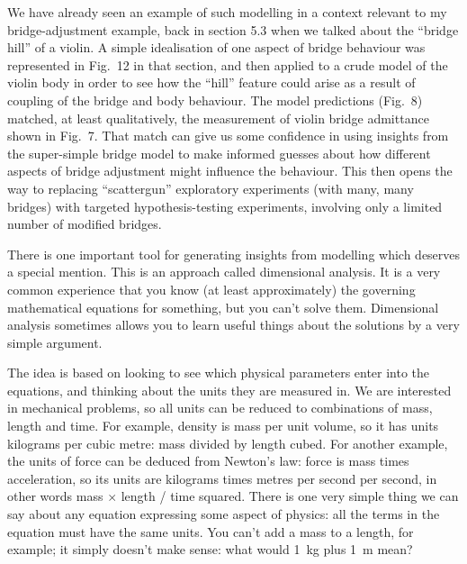   We have already seen an example of such modelling in a context relevant to my 
  bridge-adjustment example, back in section 5.3 when we talked about the 
  “bridge hill” of a violin. A simple idealisation of one aspect of bridge 
  behaviour was represented in Fig.\ 12 in that section, and then applied to a 
  crude model of the violin body in order to see how the “hill” feature could 
  arise as a result of coupling of the bridge and body behaviour. The model 
  predictions (Fig.\ 8) matched, at least qualitatively, the measurement of 
  violin bridge admittance shown in Fig.\ 7. That match can give us some 
  confidence in using insights from the super-simple bridge model to make 
  informed guesses about how different aspects of bridge adjustment might 
  influence the behaviour. This then opens the way to replacing “scattergun” 
  exploratory experiments (with many, many bridges) with targeted 
  hypothesis-testing experiments, involving only a limited number of modified 
  bridges. 

  There is one important tool for generating insights from modelling which 
  deserves a special mention. This is an approach called dimensional analysis. 
  It is a very common experience that you know (at least approximately) the 
  governing mathematical equations for something, but you can’t solve them. 
  Dimensional analysis sometimes allows you to learn useful things about the 
  solutions by a very simple argument. 

  The idea is based on looking to see which physical parameters enter into the 
  equations, and thinking about the units they are measured in. We are 
  interested in mechanical problems, so all units can be reduced to 
  combinations of mass, length and time. For example, density is mass per unit 
  volume, so it has units kilograms per cubic metre: mass divided by length 
  cubed. For another example, the units of force can be deduced from Newton’s 
  law: force is mass times acceleration, so its units are kilograms times 
  metres per second per second, in other words mass $\times$ length / time 
  squared. There is one very simple thing we can say about any equation 
  expressing some aspect of physics: all the terms in the equation must have 
  the same units. You can’t add a mass to a length, for example; it simply 
  doesn’t make sense: what would 1~kg plus 1~m mean? 

